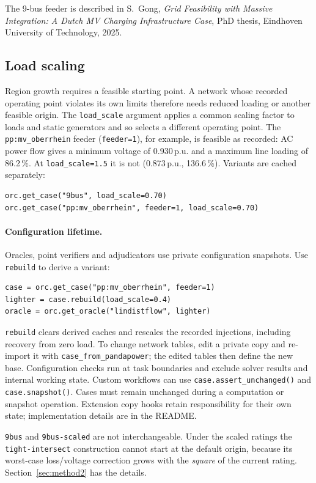 \documentclass[11pt,a4paper]{report}
\newcommand{\trap}[1]{\begin{warnbox}#1\end{warnbox}}
\newcommand{\code}[1]{\texttt{\small #1}}
\begin{document}
\noindent The 9-bus feeder is described in S.~Gong, \emph{Grid Feasibility with
Massive Integration: A Dutch MV Charging Infrastructure Case}, PhD thesis,
Eindhoven University of Technology, 2025.

\subsection{Load scaling}
\label{sec:loadscale}

Region growth requires a feasible starting point. A network whose recorded
operating point violates its own limits therefore needs reduced loading or
another feasible origin. The \code{load\_scale} argument applies a common
scaling factor to loads and static generators and so selects a different
operating point. The \code{pp:mv\_oberrhein} feeder (\code{feeder=1}), for
example, is feasible as recorded: AC power flow gives a minimum voltage of
0.930\,p.u. and a maximum line loading of 86.2\,\%. At \code{load\_scale=1.5}
it is not (0.873\,p.u., 136.6\,\%). Variants are cached separately:

\begin{lstlisting}
orc.get_case("9bus", load_scale=0.70)
orc.get_case("pp:mv_oberrhein", feeder=1, load_scale=0.70)
\end{lstlisting}

\paragraph{Configuration lifetime.} Oracles, point verifiers and adjudicators
use private configuration snapshots. Use \code{rebuild} to derive a variant:
\begin{lstlisting}
case = orc.get_case("pp:mv_oberrhein", feeder=1)
lighter = case.rebuild(load_scale=0.4)
oracle = orc.get_oracle("lindistflow", lighter)
\end{lstlisting}
\code{rebuild} clears derived caches and rescales the recorded injections,
including recovery from zero load. To change network tables, edit a private
copy and re-import it with \code{case\_from\_pandapower}; the edited tables
then define the new base. Configuration checks run at task boundaries and
exclude solver results and internal working state. Custom workflows can use
\code{case.assert\_unchanged()} and \code{case.snapshot()}. Cases must remain
unchanged during a computation or snapshot operation. Extension copy hooks
retain responsibility for their own state; implementation details are in the
README.

\trap{\code{9bus} and \code{9bus-scaled} are not interchangeable. Under the
scaled ratings the \code{tight-intersect} construction cannot start at the
default origin, because its worst-case loss/voltage correction
grows with the \emph{square} of the current rating. Section~\ref{sec:method2}
has the details.}
\end{document}
